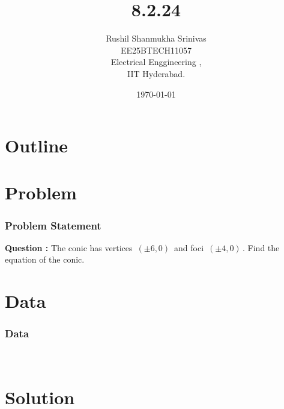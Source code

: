 \documentclass{beamer}
\title{8.2.24}
\author{Rushil Shanmukha Srinivas \\EE25BTECH11057 \\ Electrical Enggineering ,\\IIT Hyderabad.}
\date{\today}
\theoremstyle{remark}
\numberwithin{equation}{section}
\begin{document}
 

\begin{frame}
\titlepage
\end{frame}

\section*{Outline}
\begin{frame}
\tableofcontents
\end{frame}
\section{Problem}
\begin{frame}
\frametitle{Problem Statement}
\textbf{Question :} The conic has vertices $\,(\pm 6,0)\,$ and foci $\,(\pm 4,0)\,$. Find the equation of the conic.
\end{frame}
\section{Data}
\begin{frame}
\frametitle{Data}
\\ \begin{table}[h!]    
  \centering
  
  \caption{Vertex and Foci}
\end{table}
\end{frame}
\section{Solution}
\end{document}
